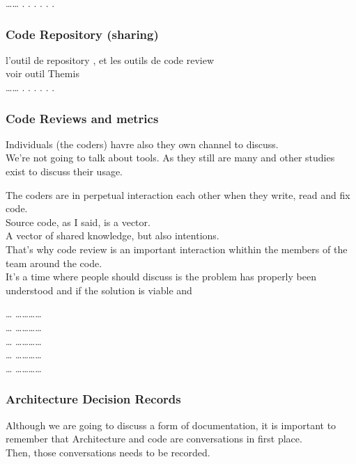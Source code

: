\ldots{}\ldots{} . . . . . .

\subsubsection{Code Repository (sharing)}\label{code-repository-sharing}

l'outil de repository , et les outils de code review\\voir outil
Themis\\\ldots{}\ldots{} . . . . . .

\subsubsection{Code Reviews and metrics}\label{code-reviews-and-metrics}

Individuals (the coders) havre also they own channel to discuss.\\We're
not going to talk about tools. As they still are many and other studies
exist to discuss their usage.

The coders are in perpetual interaction each other when they write, read
and fix code.\\Source code, as I said, is a vector.\\A vector of shared
knowledge, but also intentions.\\That's why code review is an important
interaction whithin the members of the team around the code.\\It's a
time where people should discuss is the problem has properly been
understood and if the solution is viable and

\ldots{} \ldots{}\ldots{}\ldots{}\ldots{}\\\ldots{}
\ldots{}\ldots{}\ldots{}\ldots{}\\\ldots{}
\ldots{}\ldots{}\ldots{}\ldots{}\\\ldots{}
\ldots{}\ldots{}\ldots{}\ldots{}\\\ldots{}
\ldots{}\ldots{}\ldots{}\ldots{}

\subsubsection{Architecture Decision
Records}\label{architecture-decision-records}

Although we are going to discuss a form of documentation, it is
important to remember that Architecture and code are conversations in
first place.\\Then, those conversations needs to be recorded.

